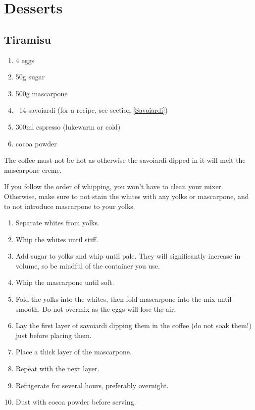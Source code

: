 \chapter{Desserts}

\section{Tiramisu}

\begin{enumerate}
  \item 4 eggs
  \item 50g sugar
  \item 500g mascarpone
  \item ~14 savoiardi (for a recipe, see section \ref{Savoiardi})
  \item 300ml espresso (lukewarm or cold)
  \item cocoa powder
\end{enumerate}

The coffee must not be hot as otherwise the savoiardi dipped in it will melt the
mascarpone creme.

If you follow the order of whipping, you won't have to clean your mixer.
Otherwise, make sure to not stain the whites with any yolks or mascarpone,
and to not introduce mascarpone to your yolks.
\begin{enumerate}
  \item Separate whites from yolks.
  \item Whip the whites until stiff.
  \item Add sugar to yolks and whip until pale. They will significantly
  increase in volume, so be mindful of the container you use.
  \item Whip the mascarpone until soft.
  \item Fold the yolks into the whites, then fold mascarpone into the mix until
   smooth. Do not overmix as the eggs will lose the air.
  \item Lay the first layer of savoiardi dipping them in the coffee (do not soak
   them!) just before placing them.
  \item Place a thick layer of the mascarpone.
  \item Repeat with the next layer.
  \item Refrigerate for several hours, preferably overnight.
  \item Dust with cocoa powder before serving.
\end{enumerate}


